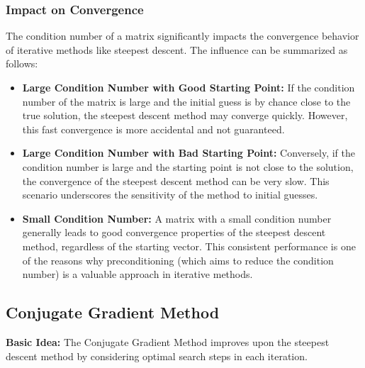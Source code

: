 \documentclass[unicode,11pt,a4paper,oneside,numbers=endperiod,openany]{scrartcl}
\begin{document}
\subsubsection{Impact on Convergence}

The condition number of a matrix significantly impacts the convergence behavior of iterative methods like steepest descent. The influence can be summarized as follows:

\begin{itemize}
    \item \textbf{Large Condition Number with Good Starting Point:}
    If the condition number of the matrix is large and the initial guess is by chance close to the true solution, the steepest descent method may converge quickly. However, this fast convergence is more accidental and not guaranteed.

    \item \textbf{Large Condition Number with Bad Starting Point:}
    Conversely, if the condition number is large and the starting point is not close to the solution, the convergence of the steepest descent method can be very slow. This scenario underscores the sensitivity of the method to initial guesses.

    \item \textbf{Small Condition Number:}
    A matrix with a small condition number generally leads to good convergence properties of the steepest descent method, regardless of the starting vector. This consistent performance is one of the reasons why preconditioning (which aims to reduce the condition number) is a valuable approach in iterative methods.
\end{itemize}
\subsection{Conjugate Gradient Method}

\textbf{Basic Idea:}
The Conjugate Gradient Method improves upon the steepest descent method by considering optimal search steps in each iteration.
\end{document}
